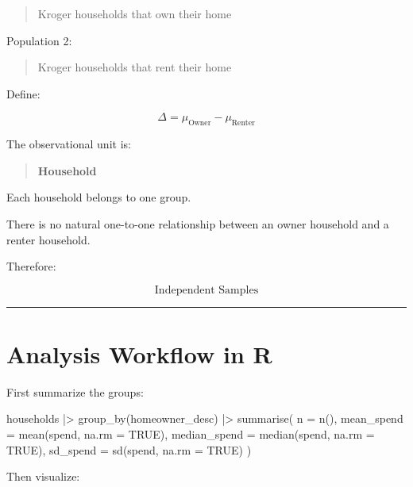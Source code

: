 \documentclass[
  letterpaper,
  DIV=11,
  numbers=noendperiod]{scrreprt}
\newenvironment{Shaded}{\begin{snugshade}}{\end{snugshade}}
\newcommand{\AttributeTok}[1]{\textcolor[rgb]{0.40,0.45,0.13}{#1}}
\newcommand{\ConstantTok}[1]{\textcolor[rgb]{0.56,0.35,0.01}{#1}}
\newcommand{\FunctionTok}[1]{\textcolor[rgb]{0.28,0.35,0.67}{#1}}
\newcommand{\NormalTok}[1]{\textcolor[rgb]{0.00,0.23,0.31}{#1}}
\newcommand{\SpecialCharTok}[1]{\textcolor[rgb]{0.37,0.37,0.37}{#1}}
\begin{document}
\begin{quote}
Kroger households that own their home
\end{quote}

Population 2:

\begin{quote}
Kroger households that rent their home
\end{quote}

Define:

\[
\Delta
=
\mu_{\text{Owner}}
-
\mu_{\text{Renter}}
\]

The observational unit is:

\begin{quote}
\textbf{Household}
\end{quote}

Each household belongs to one group.

There is no natural one-to-one relationship between an owner household
and a renter household.

Therefore:

\[
\boxed{\text{Independent Samples}}
\]

\begin{center}\rule{0.5\linewidth}{0.5pt}\end{center}

\section{Analysis Workflow in R}\label{analysis-workflow-in-r}

First summarize the groups:

\begin{Shaded}
\begin{Highlighting}[]
\NormalTok{households }\SpecialCharTok{|\textgreater{}}
    \FunctionTok{group\_by}\NormalTok{(homeowner\_desc) }\SpecialCharTok{|\textgreater{}}
    \FunctionTok{summarise}\NormalTok{(}
        \AttributeTok{n =} \FunctionTok{n}\NormalTok{(),}
        \AttributeTok{mean\_spend =} \FunctionTok{mean}\NormalTok{(spend, }\AttributeTok{na.rm =} \ConstantTok{TRUE}\NormalTok{),}
        \AttributeTok{median\_spend =} \FunctionTok{median}\NormalTok{(spend, }\AttributeTok{na.rm =} \ConstantTok{TRUE}\NormalTok{),}
        \AttributeTok{sd\_spend =} \FunctionTok{sd}\NormalTok{(spend, }\AttributeTok{na.rm =} \ConstantTok{TRUE}\NormalTok{)}
\NormalTok{    )}
\end{Highlighting}
\end{Shaded}

Then visualize:
\end{document}
